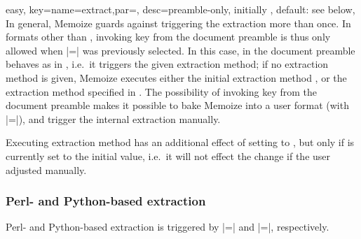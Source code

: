 \documentclass[a4paper,11pt]{article}
\begin{document}
\begin{doc}{easy,
    key={name=extract,par=,
      desc={preamble-only, initially , default: see below}},
  }
  In general, Memoize guards against triggering the extraction more than once.
  In formats other than , invoking key  from
  the document preamble is thus only allowed when
  |=| was previously selected.  In this
  case,  in the document preamble behaves as in
  , i.e.\ it triggers the given extraction method; if no
  extraction method is given, Memoize executes either the initial extraction
  method , or the extraction method specified in
  .  The possibility of invoking key  from
  the document preamble makes it possible to bake Memoize into a user format
  (with |=|), and trigger the internal
  extraction manually.

  Executing extraction method  has an additional effect
  of setting  to , but only if 
  is currently set to the initial value, i.e.\ it will not effect the change if
  the user adjusted  manually.
\end{doc}

\subsubsection{Perl- and Python-based extraction}
\label{sec:ref:extraction-perl-python}

Perl- and Python-based extraction is triggered by
|=| and
|=|, respectively.
\end{document}
